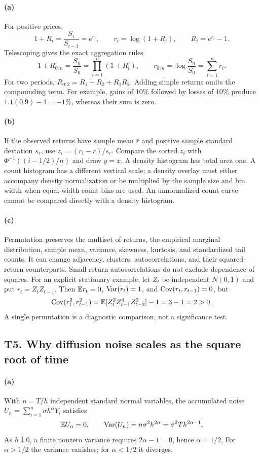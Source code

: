 \paragraph{(a)} For positive prices,
\[
 1+R_i=\frac{S_i}{S_{i-1}}=e^{r_i},\qquad
 r_i=\log(1+R_i),\qquad R_i=e^{r_i}-1.
\]
Telescoping gives the exact aggregation rules
\[
 1+R_{0:n}=\frac{S_n}{S_0}=\prod_{i=1}^n(1+R_i),
 \qquad r_{0:n}=\log\frac{S_n}{S_0}=\sum_{i=1}^n r_i.
\]
For two periods, $R_{0:2}=R_1+R_2+R_1R_2$. Adding simple returns omits the compounding term. For example, gains of $10\%$ followed by losses of $10\%$ produce $1.1(0.9)-1=-1\%$, whereas their sum is zero.
\paragraph{(b)} If the observed returns have sample mean $\bar r$ and positive sample standard deviation $s_r$, use $z_i=(r_i-\bar r)/s_r$. Compare the sorted $z_i$ with $\Phi^{-1}((i-1/2)/n)$ and draw $y=x$. A density histogram has total area one. A count histogram has a different vertical scale; a density overlay must either accompany density normalization or be multiplied by the sample size and bin width when equal-width count bins are used. An unnormalized count curve cannot be compared directly with a density histogram.
\paragraph{(c)} Permutation preserves the multiset of returns, the empirical marginal distribution, sample mean, variance, skewness, kurtosis, and standardized tail counts. It can change adjacency, clusters, autocorrelations, and their squared-return counterparts. Small return autocorrelations do not exclude dependence of squares. For an explicit stationary example, let $Z_t$ be independent $N(0,1)$ and put $r_t=Z_tZ_{t-1}$. Then $\mathbb E r_t=0$, $\operatorname{Var}(r_t)=1$, and $\operatorname{Cov}(r_t,r_{t-1})=0$, but
\[
 \operatorname{Cov}(r_t^2,r_{t-1}^2)
 =\mathbb E[Z_t^2Z_{t-1}^4Z_{t-2}^2]-1=3-1=2>0.
\]
A single permutation is a diagnostic comparison, not a significance test.

\subsection{T5. Why diffusion noise scales as the square root of time}
\paragraph{(a)} With $n=T/h$ independent standard normal variables, the accumulated noise $U_n=\sum_{i=1}^n\sigma h^\alpha Y_i$ satisfies
\[
 \mathbb E U_n=0,\qquad \operatorname{Var}(U_n)=n\sigma^2h^{2\alpha}
 =\sigma^2T h^{2\alpha-1}.
\]
As $h\downarrow0$, a finite nonzero variance requires $2\alpha-1=0$, hence $\alpha=1/2$. For $\alpha>1/2$ the variance vanishes; for $\alpha<1/2$ it diverges.
